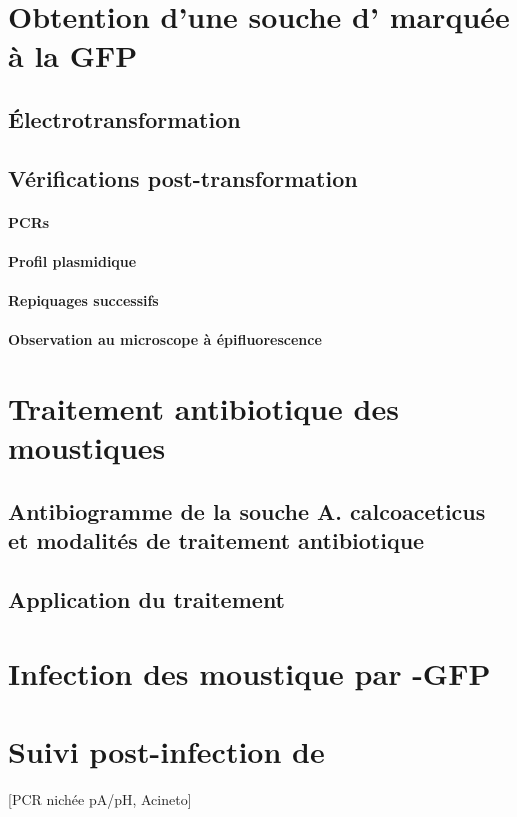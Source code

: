 \section{Obtention d'une souche d' marquée à la GFP}

\subsection{Électrotransformation}

\subsection{Vérifications post-transformation}

\paragraph{PCRs}
\paragraph{Profil plasmidique}
\paragraph{Repiquages successifs}
\paragraph{Observation au microscope à épifluorescence}

\section{Traitement antibiotique des moustiques}

\subsection{Antibiogramme de la souche A. calcoaceticus et modalités de traitement antibiotique}

\subsection{Application du traitement}

\section{Infection des moustique par -GFP}

\section{Suivi post-infection de }

[PCR nichée pA/pH, Acineto]